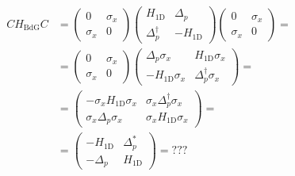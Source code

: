 \documentclass[english, parskip=full]{scrartcl}
\newcommand{\tecxt}{}
\begin{document}
\begin{align}
C H_\tecxt\text{BdG}C &= \begin{pmatrix}
0 & \sigma_x \\ \sigma_x & 0
\end{pmatrix}\begin{pmatrix}
H_{1\tecxt\text{D}} & \Delta_p \\ \Delta_p^\dagger & -H_{1\tecxt\text{D}}
\end{pmatrix}\begin{pmatrix}
0 & \sigma_x \\ \sigma_x & 0
\end{pmatrix} = \\
&=  \begin{pmatrix}
0 & \sigma_x \\ \sigma_x & 0
\end{pmatrix} \begin{pmatrix}
\Delta_p\sigma_x & H_{1\tecxt\text{D}}\sigma_x \\ 
-H_{1\tecxt\text{D}}\sigma_x & \Delta_p^\dagger\sigma_x
\end{pmatrix} = \\
&= \begin{pmatrix}
-\sigma_x H_{1\tecxt\text{D}}\sigma_x & \sigma_x\Delta_p^\dagger \sigma_x \\ 
\sigma_x \Delta_p\sigma_x & \sigma_xH_{1\tecxt\text{D}}\sigma_x
\end{pmatrix} = \\
&= \begin{pmatrix}
-H_{1\tecxt\text{D}} & \Delta_p^\ast \\ 
-\Delta_p & H_{1\tecxt\text{D}}
\end{pmatrix} = ???
\end{align}


\end{document}

